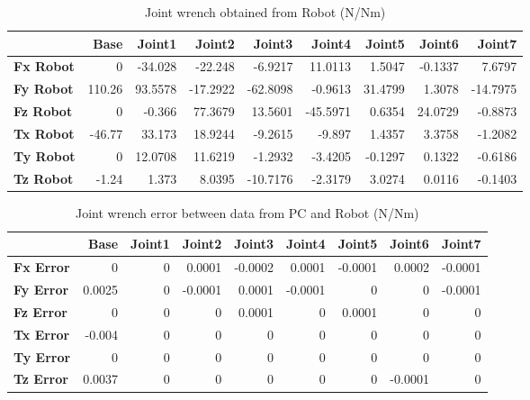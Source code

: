 \begin{table}[h!]
	\centering
	\caption{Joint wrench obtained from Robot (N/Nm)}
	\label{wrech_Robot_Pose10}
	\begin{tabular}{|l|r|r|r|r|r|r|r|r|}
		\hline
		\textbf{} & \textbf{Base} & \textbf{Joint1}  & \textbf{Joint2}  & \textbf{Joint3}  & \textbf{Joint4}  & \textbf{Joint5}  & \textbf{Joint6}  & \textbf{Joint7} \\ \hline
		\textbf{Fx Robot}  & 0        & -34.028        & -22.248        & -6.9217        & 11.0113        & 1.5047        & -0.1337        & 7.6797 \\ \hline
		\textbf{Fy Robot}  & 110.26        & 93.5578        & -17.2922        & -62.8098        & -0.9613        & 31.4799        & 1.3078        & -14.7975 \\ \hline
		\textbf{Fz Robot}  & 0        & -0.366        & 77.3679        & 13.5601        & -45.5971        & 0.6354        & 24.0729        & -0.8873 \\ \hline
		\textbf{Tx Robot}  & -46.77        & 33.173        & 18.9244        & -9.2615        & -9.897        & 1.4357        & 3.3758        & -1.2082 \\ \hline
		\textbf{Ty Robot}  & 0        & 12.0708        & 11.6219        & -1.2932        & -3.4205        & -0.1297        & 0.1322        & -0.6186 \\ \hline
		\textbf{Tz Robot}  & -1.24        & 1.373        & 8.0395        & -10.7176        & -2.3179        & 3.0274        & 0.0116        & -0.1403 \\ \hline
	\end{tabular}
\end{table}

\begin{table}[h!]
	\centering
	\caption{Joint wrench error between data from PC and Robot (N/Nm)}
	\label{wrech_Error_Pose10}
	\begin{tabular}{|l|r|r|r|r|r|r|r|r|}
		\hline
		\textbf{}  & \textbf{Base} & \textbf{Joint1}  & \textbf{Joint2}  & \textbf{Joint3}  & \textbf{Joint4}  & \textbf{Joint5}  & \textbf{Joint6}  & \textbf{Joint7} \\ \hline
		\textbf{Fx Error}  & 0        & 0        & 0.0001        & -0.0002        & 0.0001        & -0.0001        & 0.0002        & -0.0001 \\ \hline
		\textbf{Fy Error}  & 0.0025        & 0        & -0.0001        & 0.0001        & -0.0001        & 0        & 0        & -0.0001 \\ \hline
		\textbf{Fz Error}  & 0        & 0        & 0        & 0.0001        & 0        & 0.0001        & 0        & 0 \\ \hline
		\textbf{Tx Error}  & -0.004        & 0        & 0        & 0        & 0        & 0        & 0        & 0 \\ \hline
		\textbf{Ty Error}  & 0        & 0        & 0        & 0        & 0        & 0        & 0        & 0 \\ \hline
		\textbf{Tz Error}  & 0.0037        & 0        & 0        & 0        & 0        & 0        & -0.0001        & 0 \\ \hline
	\end{tabular}
\end{table}

